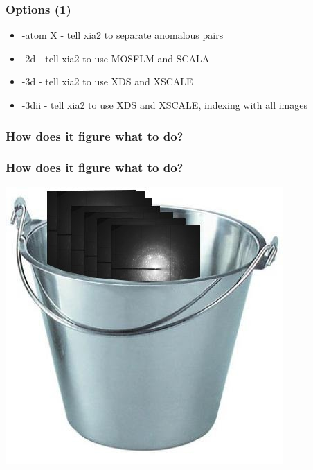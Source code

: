 \documentclass[slides,compress]{beamer}
\begin{document}
\begin{frame}
\frametitle{Options (1)}
\begin{itemize}
\item{-atom X - tell xia2 to separate anomalous pairs}
\item{-2d - tell xia2 to use MOSFLM and SCALA}
\item{-3d - tell xia2 to use XDS and XSCALE}
\item{-3dii - tell xia2 to use XDS and XSCALE, indexing with all images}
\end{itemize}
\end{frame}

\begin{frame}
\frametitle{How does it figure what to do?}
\begin{itemize}
\end{itemize}
\end{frame}

\begin{frame}
\frametitle{How does it figure what to do?}
\hspace{3cm}
\includegraphics[scale=0.4]{figures/bucket-of-images.jpg}
\end{frame}
\end{document}

